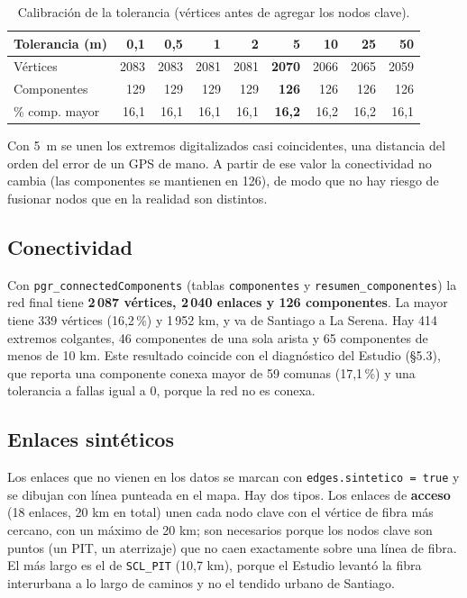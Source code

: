 \documentclass[11pt,a4paper]{article}
\newcommand{\cod}[1]{\texttt{#1}}
\begin{document}
\begin{table}[h]
\centering
\begin{tabular}{lrrrrrrrr}
\toprule
Tolerancia (m) & 0,1 & 0,5 & 1 & 2 & \textbf{5} & 10 & 25 & 50 \\
\midrule
Vértices & 2083 & 2083 & 2081 & 2081 & \textbf{2070} & 2066 & 2065 & 2059 \\
Componentes & 129 & 129 & 129 & 129 & \textbf{126} & 126 & 126 & 126 \\
\% comp. mayor & 16,1 & 16,1 & 16,1 & 16,1 & \textbf{16,2} & 16,2 & 16,2 & 16,1 \\
\bottomrule
\end{tabular}
\caption{Calibración de la tolerancia (vértices antes de agregar los nodos clave).}
\end{table}

Con 5~m se unen los extremos digitalizados casi coincidentes, una distancia del orden del error de un
GPS de mano. A partir de ese valor la conectividad no cambia (las componentes se mantienen en 126), de
modo que no hay riesgo de fusionar nodos que en la realidad son distintos.

\subsection{Conectividad}
Con \cod{pgr\_connectedComponents} (tablas \cod{componentes} y \cod{resumen\_componentes}) la red
final tiene \textbf{2\,087 vértices, 2\,040 enlaces y 126 componentes}. La mayor tiene 339 vértices
(16,2\,\%) y 1\,952 km, y va de Santiago a La Serena. Hay 414 extremos colgantes, 46 componentes de
una sola arista y 65 componentes de menos de 10 km. Este resultado coincide con el diagnóstico del
Estudio (§5.3), que reporta una componente conexa mayor de 59 comunas (17,1\,\%) y una tolerancia a
fallas igual a 0, porque la red no es conexa.

\subsection{Enlaces sintéticos}\label{sec:sinteticos}
Los enlaces que no vienen en los datos se marcan con \cod{edges.sintetico = true} y se dibujan con
línea punteada en el mapa. Hay dos tipos. Los enlaces de \textbf{acceso} (18 enlaces, 20 km en total)
unen cada nodo clave con el vértice de fibra más cercano, con un máximo de 20 km; son necesarios porque
los nodos clave son puntos (un PIT, un aterrizaje) que no caen exactamente sobre una línea de fibra. El
más largo es el de \cod{SCL\_PIT} (10,7 km), porque el Estudio levantó la fibra interurbana a lo largo
de caminos y no el tendido urbano de Santiago.
\end{document}
